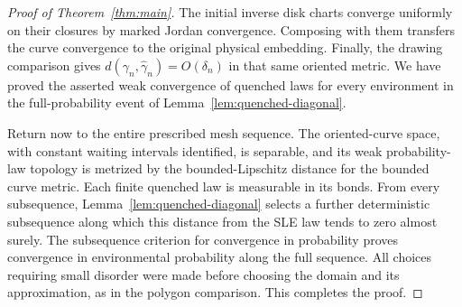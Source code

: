 \begin{proof}[Proof of Theorem~\ref{thm:main}]
The initial inverse disk charts converge uniformly on their
closures by marked Jordan convergence.  Composing with them
transfers the curve convergence to the original physical
embedding.  Finally, the drawing comparison gives
$d(\gamma_n,\widehat\gamma_n)=O(\delta_n)$ in that same oriented
metric.  We have proved the asserted weak convergence of
quenched laws for every environment in the full-probability
event of Lemma~\ref{lem:quenched-diagonal}.

Return now to the entire prescribed mesh sequence.  The
oriented-curve space, with constant waiting intervals identified,
is separable, and its weak probability-law topology is metrized
by the bounded-Lipschitz distance for the bounded curve metric.
Each finite quenched law is measurable in its bonds.  From every
subsequence, Lemma~\ref{lem:quenched-diagonal} selects a further
deterministic subsequence along which this distance from the SLE
law tends to zero almost surely.  The subsequence criterion for
convergence in probability proves convergence in environmental
probability along the full sequence.  All choices requiring
small disorder were made before choosing the domain and its
approximation, as in the polygon comparison.  This completes
the proof.
\end{proof}

